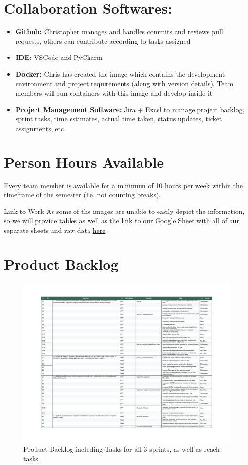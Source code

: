 \documentclass[12pt]{article}
\begin{document}
\maketitlepage

\section{Collaboration Softwares:}
\begin{itemize}
        \item \textbf{Github:} Christopher manages and handles commits and reviews pull requests, others can contribute according to tasks assigned
        \item \textbf{IDE:} VSCode and PyCharm
        \item \textbf{Docker:} Chris has created the image which contains the development environment and project requirements (along with version details). Team members will run containers with this image and develop inside it.
        \item \textbf{Project Management Software:} Jira + Excel to manage project backlog, sprint tasks, time estimates, actual time taken, status updates, ticket assignments, etc.
\end{itemize}

\section{Person Hours Available}
Every team member is available for a minimum of 10 hours per week within the timeframe of the semester (i.e. not counting breaks).

\begin{important}{Link to Work}
        As some of the images are unable to easily depict the information, so we will provide tables as well as the link to our
        Google Sheet with all of our separate sheets and raw data \href{https://docs.google.com/spreadsheets/d/1keQPuotPkZdqrqZ_ybHGJQ7_mYCZARqL/edit?usp=sharing&ouid=113464029339812046851&rtpof=true&sd=true}{here}.
\end{important}

\section{Product Backlog}

\begin{figure}[H]
        \centering
        \includegraphics[width=0.75\linewidth]{images/Sprint Backlog.xlsx-ProjectBacklog.pdf}
        \caption{Product Backlog including Tasks for all 3 sprints, as well as reach tasks.}
        \label{fig:1}
\end{figure}
\end{document}
